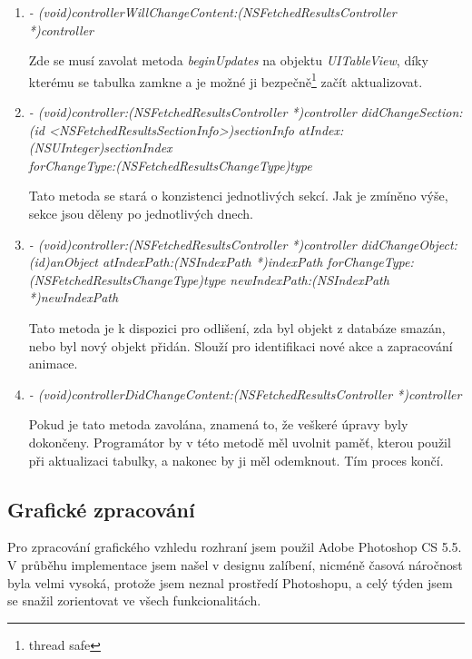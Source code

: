 \begin{enumerate}
	\item
	\emph{- (void)controllerWillChangeContent:(NSFetchedResultsController *)controller}
	
	Zde se musí zavolat metoda \emph{beginUpdates} na objektu \emph{UITableView}, díky kterému se tabulka zamkne a je možné ji bezpečně\footnote{thread safe} začít aktualizovat.
	
	\item
	\emph{- (void)controller:(NSFetchedResultsController *)controller didChangeSection:\\(id <NSFetchedResultsSectionInfo>)sectionInfo atIndex:(NSUInteger)sectionIndex \\forChangeType:(NSFetchedResultsChangeType)type}
	
	Tato metoda se stará o konzistenci jednotlivých sekcí. Jak je zmíněno výše, sekce jsou děleny po jednotlivých dnech.
	
	\item
	\emph{- (void)controller:(NSFetchedResultsController *)controller didChangeObject:\\(id)anObject atIndexPath:(NSIndexPath *)indexPath forChangeType:\\(NSFetchedResultsChangeType)type newIndexPath:(NSIndexPath *)newIndexPath}
	
	Tato metoda je k dispozici pro odlišení, zda byl objekt z databáze smazán, nebo byl nový objekt přidán. Slouží pro identifikaci nové akce a zapracování animace.

	\item
	\emph{- (void)controllerDidChangeContent:(NSFetchedResultsController *)controller}
	
	Pokud je tato metoda zavolána, znamená to, že veškeré úpravy byly dokončeny. Programátor by v této metodě měl uvolnit paměť, kterou použil při aktualizaci tabulky, a nakonec by ji měl odemknout. Tím proces končí.
\end{enumerate}

\subsection{Grafické zpracování}
Pro zpracování grafického vzhledu rozhraní jsem použil Adobe Photoshop CS 5.5. V průběhu implementace jsem našel v designu zalíbení, nicméně časová náročnost byla velmi vysoká, protože jsem neznal prostředí Photoshopu, a celý týden jsem se snažil zorientovat ve všech funkcionalitách.

